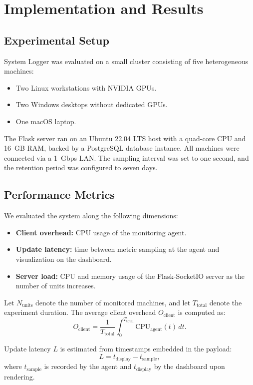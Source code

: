 \documentclass[conference]{IEEEtran}
\begin{document}
\section{Implementation and Results}
\label{sec:results}

\subsection{Experimental Setup}

System Logger was evaluated on a small cluster consisting of five heterogeneous machines:
\begin{itemize}
  \item Two Linux workstations with NVIDIA GPUs.
  \item Two Windows desktops without dedicated GPUs.
  \item One macOS laptop.
\end{itemize}
The Flask server ran on an Ubuntu 22.04 LTS host with a quad-core CPU and 16~GB RAM, backed by a PostgreSQL database instance. All machines were connected via a 1~Gbps LAN. The sampling interval was set to one second, and the retention period was configured to seven days.

\subsection{Performance Metrics}

We evaluated the system along the following dimensions:
\begin{itemize}
  \item \textbf{Client overhead:} CPU usage of the monitoring agent.
  \item \textbf{Update latency:} time between metric sampling at the agent and visualization on the dashboard.
  \item \textbf{Server load:} CPU and memory usage of the Flask-SocketIO server as the number of units increases.
\end{itemize}

Let $N_{\text{units}}$ denote the number of monitored machines, and let $T_{\text{total}}$ denote the experiment duration. The average client overhead $O_{\text{client}}$ is computed as:
\begin{equation}
  O_{\text{client}} = \frac{1}{T_{\text{total}}} \int_0^{T_{\text{total}}} \text{CPU}_{\text{agent}}(t) \, dt.
\end{equation}

Update latency $L$ is estimated from timestamps embedded in the payload:
\begin{equation}
  L = t_{\text{display}} - t_{\text{sample}},
\end{equation}
where $t_{\text{sample}}$ is recorded by the agent and $t_{\text{display}}$ by the dashboard upon rendering.
\end{document}
